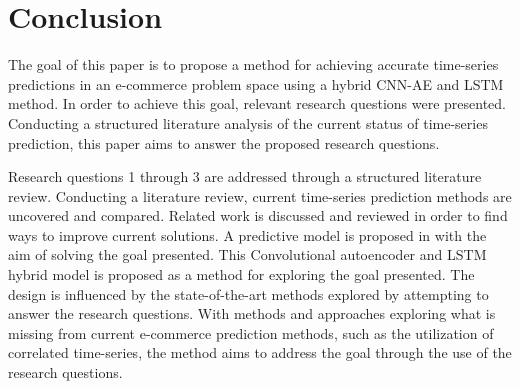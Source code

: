 \section{Conclusion}
\label{section:Discussion:Clonclusion}


The goal of this paper is to propose a method for achieving accurate time-series predictions in an e-commerce
problem space using a hybrid CNN-AE and LSTM method.
In order to achieve this goal, relevant research questions were presented.
Conducting a structured literature analysis of the current status of time-series prediction,
this paper aims to answer the proposed research questions.

Research questions 1 through 3 are addressed through a structured literature review.
Conducting a literature review, current time-series prediction methods are uncovered and compared.
Related work is discussed and reviewed in order to find ways to improve current solutions.
A predictive model is proposed in  with the aim of solving the goal presented.
This Convolutional autoencoder and LSTM hybrid model is proposed as a method for exploring the goal presented.
The design is influenced by the state-of-the-art methods explored by attempting to answer the research questions.
With methods and approaches exploring what is missing from current e-commerce prediction methods,
such as the utilization of correlated time-series, the method aims to address the goal through the use of the research questions.



